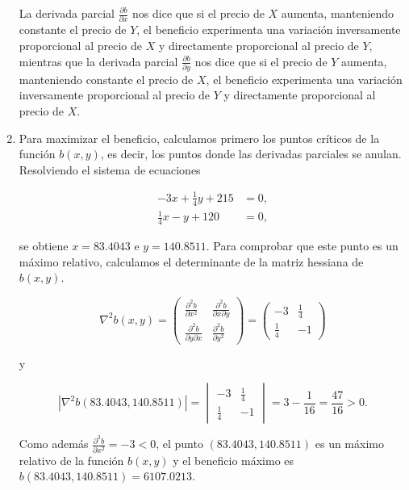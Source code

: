 \documentclass[
  a4paper,
]{scrreport}
\theoremstyle{definition}
\theoremstyle{remark}
\begin{document}
\begin{tcolorbox}
\begin{enumerate}
  La derivada parcial \(\frac{\partial b}{\partial x}\) nos dice que si
  el precio de \(X\) aumenta, manteniendo constante el precio de \(Y\),
  el beneficio experimenta una variación inversamente proporcional al
  precio de \(X\) y directamente proporcional al precio de \(Y\),
  mientras que la derivada parcial \(\frac{\partial b}{\partial y}\) nos
  dice que si el precio de \(Y\) aumenta, manteniendo constante el
  precio de \(X\), el beneficio experimenta una variación inversamente
  proporcional al precio de \(Y\) y directamente proporcional al precio
  de \(X\).
\item
  Para maximizar el beneficio, calculamos primero los puntos críticos de
  la función \(b(x,y)\), es decir, los puntos donde las derivadas
  parciales se anulan. Resolviendo el sistema de ecuaciones

  \begin{align*}
  -3x + \frac{1}{4}y + 215 &= 0, \\
  \frac{1}{4}x - y + 120 &= 0,
  \end{align*}

  se obtiene \(x=83.4043\) e \(y=140.8511\). Para comprobar que este
  punto es un máximo relativo, calculamos el determinante de la matriz
  hessiana de \(b(x,y)\).

  \[
  \nabla^2 b(x,y) = 
  \begin{pmatrix}
  \frac{\partial^2 b}{\partial x^2} & \frac{\partial^2 b}{\partial x \partial y} \\
  \frac{\partial^2 b}{\partial y \partial x} & \frac{\partial^2 b}{\partial y^2}
  \end{pmatrix}
  =
  \begin{pmatrix}
  -3 & \frac{1}{4} \\
  \frac{1}{4} & -1
  \end{pmatrix}
  \]

  y

  \[
  |\nabla^2 b(83.4043, 140.8511)| = 
  \begin{vmatrix}
  -3 & \frac{1}{4} \\
  \frac{1}{4} & -1
  \end{vmatrix}
  = 3 - \frac{1}{16} = \frac{47}{16} > 0.
  \]

  Como además \(\frac{\partial^2 b}{\partial x^2} = -3 < 0\), el punto
  \((83.4043, 140.8511)\) es un máximo relativo de la función \(b(x,y)\)
  y el beneficio máximo es \(b(83.4043, 140.8511) = 6107.0213\).
\end{enumerate}

\end{tcolorbox}
\end{document}

